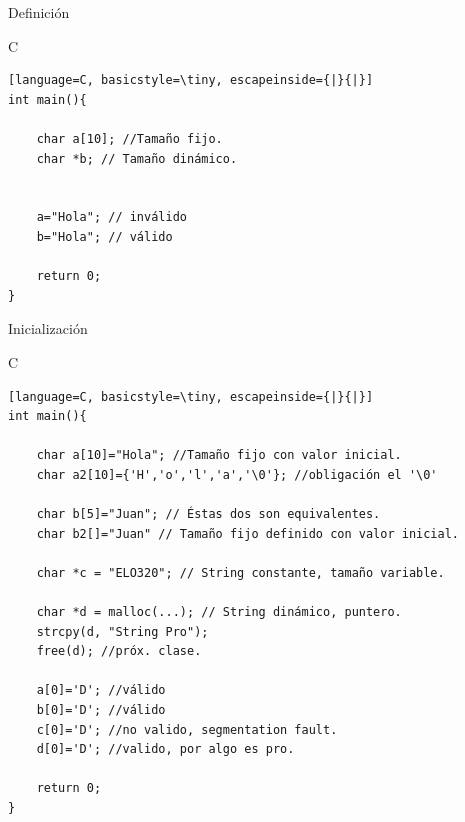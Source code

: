 \documentclass{beamer}
\begin{document}
\begin{frame}[fragile]{Definición}
\begin{exampleblock}{C}
\begin{lstlisting}[language=C, basicstyle=\tiny, escapeinside={|}{|}]
int main(){

	char a[10]; //Tamaño fijo.
	char *b; // Tamaño dinámico.


	a="Hola"; // inválido
	b="Hola"; // válido

	return 0;
}

\end{lstlisting}
\end{exampleblock}
\end{frame}

\begin{frame}[fragile]{Inicialización}
\begin{exampleblock}{C}
\begin{lstlisting}[language=C, basicstyle=\tiny, escapeinside={|}{|}]
int main(){

	char a[10]="Hola"; //Tamaño fijo con valor inicial.
	char a2[10]={'H','o','l','a','\0'}; //obligación el '\0'

	char b[5]="Juan"; // Éstas dos son equivalentes.
	char b2[]="Juan" // Tamaño fijo definido con valor inicial.
	
	char *c = "ELO320"; // String constante, tamaño variable. 

	char *d = malloc(...); // String dinámico, puntero.
	strcpy(d, "String Pro");
	free(d); //próx. clase. 	

	a[0]='D'; //válido
	b[0]='D'; //válido
	c[0]='D'; //no valido, segmentation fault.
	d[0]='D'; //valido, por algo es pro.

	return 0;
}

\end{lstlisting}
\end{exampleblock}
\end{frame}
\end{document}
